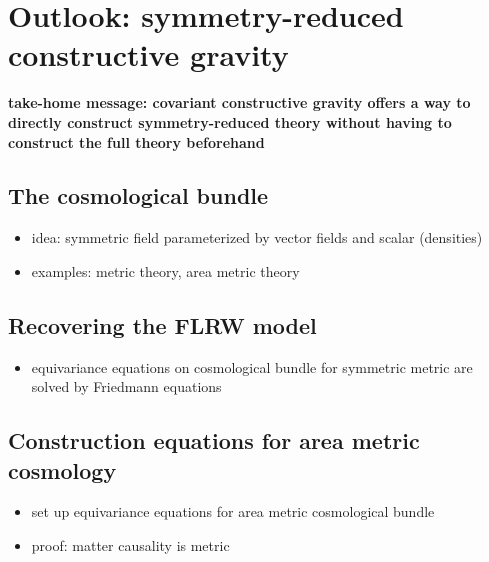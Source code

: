 \chapter{Outlook: symmetry-reduced constructive gravity}
\label{chapter_cosmo}

\textbf{take-home message: covariant constructive gravity offers a way to directly construct symmetry-reduced theory without having to construct the full theory beforehand}

\section{The cosmological bundle}
\begin{itemize}
\item idea: symmetric field parameterized by vector fields and scalar (densities)
\item examples: metric theory, area metric theory
\end{itemize}

\section{Recovering the FLRW model}
\begin{itemize}
\item equivariance equations on cosmological bundle for symmetric metric are solved by Friedmann equations
\end{itemize}

\section{Construction equations for area metric cosmology}
\begin{itemize}
\item set up equivariance equations for area metric cosmological bundle
\item proof: matter causality is metric
\end{itemize}


